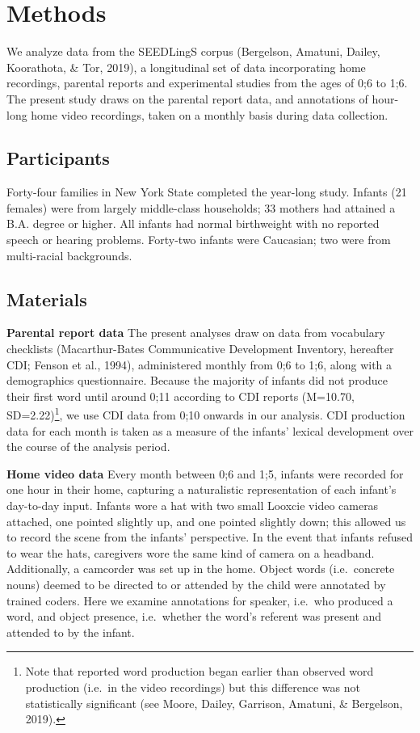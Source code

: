 \documentclass[
  english,
  man,floatsintext]{apa6}
\begin{document}
\hypertarget{methods}{%
\section{Methods}\label{methods}}

We analyze data from the SEEDLingS corpus (Bergelson, Amatuni, Dailey, Koorathota, \& Tor, 2019), a longitudinal set of data incorporating home recordings, parental reports and experimental studies from the ages of 0;6 to 1;6. The present study draws on the parental report data, and annotations of hour-long home video recordings, taken on a monthly basis during data collection.

\hypertarget{participants}{%
\subsection{Participants}\label{participants}}

Forty-four families in New York State completed the year-long study. Infants (21 females) were from largely middle-class households; 33 mothers had attained a B.A. degree or higher. All infants had normal birthweight with no reported speech or hearing problems. Forty-two infants were Caucasian; two were from multi-racial backgrounds.

\hypertarget{materials}{%
\subsection{Materials}\label{materials}}

\textbf{Parental report data} The present analyses draw on data from vocabulary checklists (Macarthur-Bates Communicative Development Inventory, hereafter CDI; Fenson et al., 1994), administered monthly from 0;6 to 1;6, along with a demographics questionnaire. Because the majority of infants did not produce their first word until around 0;11 according to CDI reports (M=10.70, SD=2.22)\footnote{Note that reported word production began earlier than observed word production (i.e.~in the video recordings) but this difference was not statistically significant (see Moore, Dailey, Garrison, Amatuni, \& Bergelson, 2019).}, we use CDI data from 0;10 onwards in our analysis. CDI production data for each month is taken as a measure of the infants' lexical development over the course of the analysis period.

\textbf{Home video data} Every month between 0;6 and 1;5, infants were recorded for one hour in their home, capturing a naturalistic representation of each infant's day-to-day input. Infants wore a hat with two small Looxcie video cameras attached, one pointed slightly up, and one pointed slightly down; this allowed us to record the scene from the infants' perspective. In the event that infants refused to wear the hats, caregivers wore the same kind of camera on a headband. Additionally, a camcorder was set up in the home. Object words (i.e.~concrete nouns) deemed to be directed to or attended by the child were annotated by trained coders. Here we examine annotations for speaker, i.e.~who produced a word, and object presence, i.e.~whether the word's referent was present and attended to by the infant.
\end{document}
